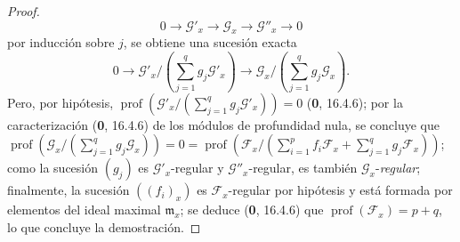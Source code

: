 \begin{proof}
\[
0\longrightarrow\mathcal G'_x\longrightarrow\mathcal G_x
\longrightarrow\mathcal G''_x\longrightarrow0
\]
por inducción sobre $j$, se obtiene una sucesión exacta
\[
0\longrightarrow\mathcal G'_x/
\left(\sum_{j=1}^{q}g_j\mathcal G'_x\right)
\longrightarrow\mathcal G_x/
\left(\sum_{j=1}^{q}g_j\mathcal G_x\right).
\]
Pero, por hipótesis,
$\operatorname{prof}(\mathcal G'_x/(\sum_{j=1}^{q}g_j\mathcal G'_x))=0$
(\textbf 0, 16.4.6); por la caracterización (\textbf 0, 16.4.6) de los módulos de profundidad
nula, se concluye que
$\operatorname{prof}(\mathcal G_x/(\sum_{j=1}^{q}g_j\mathcal G_x))=0=\operatorname{prof}(\mathcal F_x/(\sum_{i=1}^{p}f_i\mathcal F_x+\sum_{j=1}^{q}g_j\mathcal F_x))$;
como la sucesión $(g_j)$ es $\mathcal G'_x$-regular y
$\mathcal G''_x$-regular, es también $\mathcal G_x$-\emph{regular}; finalmente, la
sucesión $((f_i)_x)$ es $\mathcal F_x$-regular por hipótesis y está formada
por elementos del ideal maximal $\mathfrak m_x$; se deduce (\textbf 0, 16.4.6)
que $\operatorname{prof}(\mathcal F_x)=p+q$, lo que concluye la
demostración.
\end{proof}
